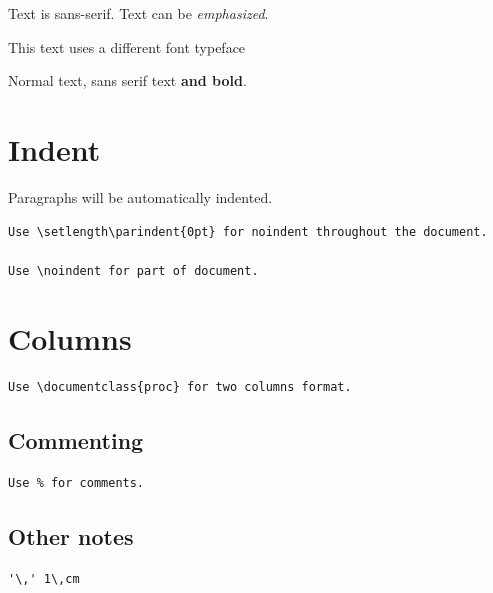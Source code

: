 \documentclass{article}
\begin{document}
{\sffamily
	Text is sans-serif. Text can be {\em emphasized}.
}

{\selectfont
	This text uses a different font typeface
}

Normal text, {\sffamily sans serif text {\bfseries and bold}}.

\section{Indent}

Paragraphs will be automatically indented.

\begin{verbatim}
Use \setlength\parindent{0pt} for noindent throughout the document.

Use \noindent for part of document.

\end{verbatim}

\section{Columns}
\begin{verbatim}
Use \documentclass{proc} for two columns format.
\end{verbatim}

\subsection{Commenting}
\begin{verbatim}
Use % for comments.

\end{verbatim}

\subsection{Other notes}
\begin{verbatim}
'\,' 1\,cm
\end{verbatim}
\end{document}
